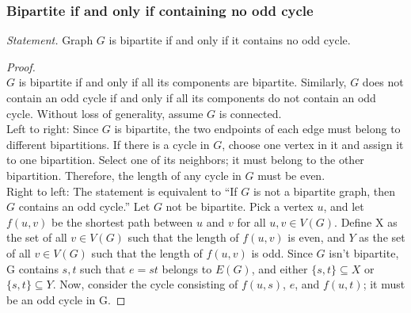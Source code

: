 \documentclass[a4paper,12pt]{report}
\begin{document}
\subsubsection{Bipartite if and only if containing no odd cycle}
\textit{Statement. }Graph $G$ is bipartite if and only if it contains no odd cycle.
\begin{proof}\mbox{}\\
$G$ is bipartite if and only if all its components are bipartite. Similarly, $G$ does not contain an odd cycle if and only if all its components do not contain an odd cycle. Without loss of generality, assume $G$ is connected. \\
Left to right: Since $G$ is bipartite, the two endpoints of each edge must belong to different bipartitions. If there is a cycle in $G$, choose one vertex in it and assign it to one bipartition. Select one of its neighbors; it must belong to the other bipartition. Therefore, the length of any cycle in $G$ must be even. \\
Right to left: The statement is equivalent to ``If $G$ is not a bipartite graph, then $G$ contains an odd cycle.'' Let $G$ not be bipartite. Pick a vertex $u$, and let $f(u, v)$ be the shortest path between $u$ and $v$ for all $u, v \in V(G)$. Define X as the set of all $v \in V(G)$ such that the length of $f(u, v)$ is even, and $Y$ as the set of all $v \in V(G)$ such that the length of $f(u, v)$ is odd. Since $G$ isn't bipartite, G contains $s, t$ such that $e = st$ belongs to $E(G)$, and either $\{s, t\}\subseteq X$ or $\{s, t\}\subseteq Y$. Now, consider the cycle consisting of $f(u, s)$, $e$, and $f(u, t)$; it must be an odd cycle in G.
\end{proof}
\end{document}
